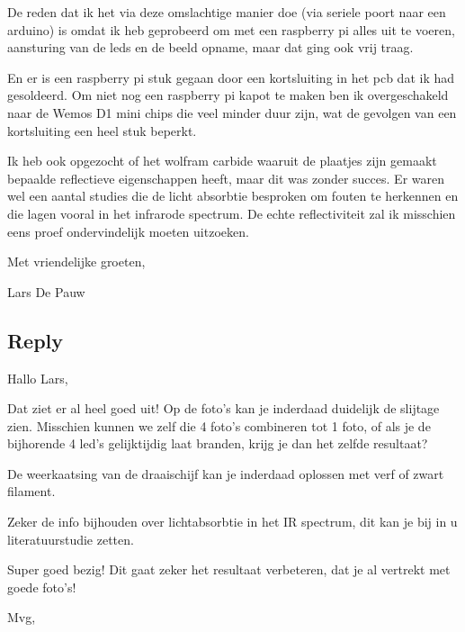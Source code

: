 \documentclass{scrartcl}
\begin{document}
 

De reden dat ik het via deze omslachtige manier doe (via seriele poort naar een arduino) is omdat ik heb geprobeerd om met een raspberry pi alles uit te voeren, aansturing van de leds en de beeld opname, maar dat ging ook vrij traag.

En er is een raspberry pi stuk gegaan door een kortsluiting in het pcb dat ik had gesoldeerd. Om niet nog een raspberry pi kapot te maken ben ik overgeschakeld naar de Wemos D1 mini chips die veel minder duur zijn, wat de gevolgen van een kortsluiting een heel stuk beperkt.

 

Ik heb ook opgezocht of het wolfram carbide waaruit de plaatjes zijn gemaakt bepaalde reflectieve eigenschappen heeft, maar dit was zonder succes. Er waren wel een aantal studies die de licht absorbtie besproken om fouten te herkennen en die lagen vooral in het infrarode spectrum. De echte reflectiviteit zal ik misschien eens proef ondervindelijk moeten uitzoeken.

 

Met vriendelijke groeten,

 

Lars De Pauw



\subsection{Reply}

Hallo Lars,



Dat ziet er al heel goed uit!​ Op de foto's kan je inderdaad duidelijk de slijtage zien. Misschien kunnen we zelf die 4 foto's combineren tot 1 foto, of als je de bijhorende 4 led's gelijktijdig laat branden, krijg je dan het zelfde resultaat? 



De weerkaatsing van de draaischijf kan je inderdaad oplossen met verf of zwart filament. 



Zeker de info bijhouden over lichtabsorbtie in het IR spectrum, dit kan je bij in u literatuurstudie zetten.



Super goed bezig! Dit gaat zeker het resultaat verbeteren, dat je al vertrekt met goede foto's!



Mvg,
\end{document}
